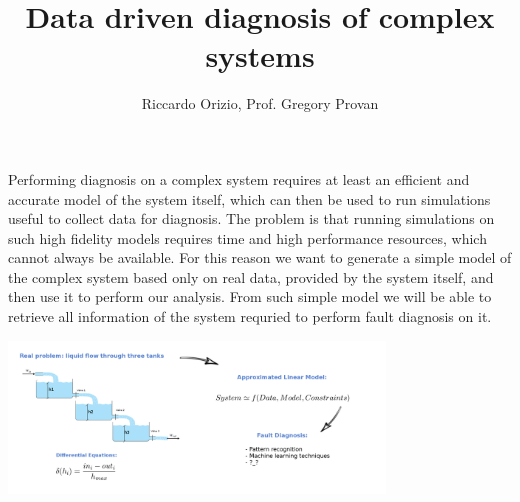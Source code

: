 \documentclass[a0paper]{tikzposter}
\title{Data driven diagnosis of complex systems}
\author{Riccardo Orizio, Prof. Gregory Provan}
\institute{University College Cork}
\begin{document}
	\maketitle[width=0.9\textwidth]


	{
		Performing diagnosis on a complex system requires at least an efficient
		and accurate model of the system itself, which can then be used to
		run simulations useful to collect data for diagnosis.
		The problem is that running simulations on such high fidelity models
		requires time and high performance resources, which cannot always be
		available.
		For this reason we want to generate a simple model of the complex system
		based only on real data, provided by the system itself, and then use it
		to perform our analysis.
		From such simple model we will be able to retrieve all information of
		the system requried to perform fault diagnosis on it.

		\begin{center}
			\includegraphics[width=0.75\textwidth]{./Images/3tanks.png}
		\end{center}
	}
\end{document}

